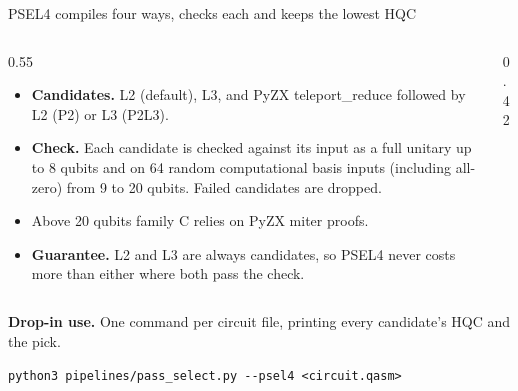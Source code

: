 \documentclass[aspectratio=169,11pt]{beamer}
\newcommand{\dropin}{%
  \colorbox{accent!8}{\parbox{\dimexpr\linewidth-2\fboxsep}{\centering\small
  \texttt{python3 pipelines/pass\_select.py -{}-psel4 \textless circuit.qasm\textgreater}}}}
\begin{document}
\begin{frame}{PSEL4 compiles four ways, checks each and keeps the lowest HQC}
  \small
  \begin{columns}[T,onlytextwidth]
    \begin{column}{0.55\textwidth}
      \begin{itemize}\setlength{\itemsep}{4pt}
        \item \textbf{Candidates.} L2 (default), L3, and PyZX teleport\_reduce followed by L2 (P2) or L3 (P2L3).
        \item \textbf{Check.} Each candidate is checked against its input as a full unitary up to 8 qubits and on 64 random computational basis inputs (including all-zero) from 9 to 20 qubits. Failed candidates are dropped.
        \item Above 20 qubits family C relies on PyZX miter proofs.
        \item \textbf{Guarantee.} L2 and L3 are always candidates, so PSEL4 never costs more than either where both pass the check.
      \end{itemize}
    \end{column}
    \begin{column}{0.42\textwidth}
      \centering
    \end{column}
  \end{columns}
  \vspace{0.35cm}
  {\footnotesize\textbf{Drop-in use.} One command per circuit file, printing every candidate's HQC and the pick.\par}
  \smallskip
  \dropin
\end{frame}
\end{document}
